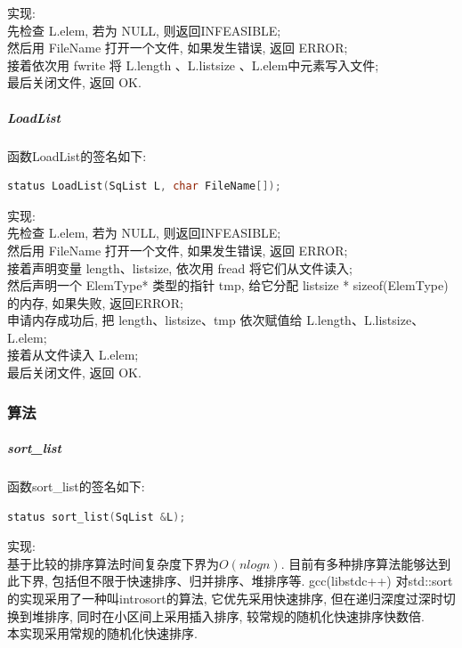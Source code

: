 \documentclass[supercite]{Experimental_Report}
\theoremstyle{definition}
\begin{document}
\noindent
实现: \\
先检查 L.elem, 若为 NULL, 则返回INFEASIBLE; \\
然后用 FileName 打开一个文件, 如果发生错误, 返回 ERROR; \\
接着依次用 fwrite 将 L.length 、L.listsize 、L.elem中元素写入文件; \\
最后关闭文件, 返回 OK. \\

\subparagraph{LoadList}
\noindent
函数LoadList的签名如下:
\begin{lstlisting}[language=C++, frame=single]
status LoadList(SqList L, char FileName[]);
\end{lstlisting}

\noindent
实现: \\
先检查 L.elem, 若为 NULL, 则返回INFEASIBLE; \\
然后用 FileName 打开一个文件, 如果发生错误, 返回 ERROR; \\
接着声明变量 length、listsize, 依次用 fread 将它们从文件读入; \\
然后声明一个 ElemType* 类型的指针 tmp, 给它分配 listsize * sizeof(ElemType) 的内存, 如果失败, 返回ERROR; \\
申请内存成功后, 把 length、listsize、tmp 依次赋值给 L.length、L.listsize、L.elem; \\
接着从文件读入 L.elem; \\
最后关闭文件, 返回 OK. \\

\newpage

\subsubsection{算法}

\subparagraph{sort\_list}
\noindent
函数sort\_list的签名如下:
\begin{lstlisting}[language=C++, frame=single]
status sort_list(SqList &L);
\end{lstlisting}

\noindent
实现: \\
基于比较的排序算法时间复杂度下界为$O(nlogn)$. 目前有多种排序算法能够达到此下界, 包括但不限于快速排序、归并排序、堆排序等. gcc(libstdc++) 对std::sort的实现采用了一种叫introsort的算法, 它优先采用快速排序, 但在递归深度过深时切换到堆排序, 同时在小区间上采用插入排序, 较常规的随机化快速排序快数倍. \\
本实现采用常规的随机化快速排序. \\
\end{document}
